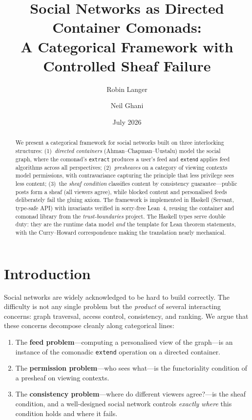 \documentclass[11pt,a4paper]{article}
\title{Social Networks as Directed Container Comonads:\\
A Categorical Framework with Controlled Sheaf Failure}
\author{Robin Langer \and Neil Ghani}
\date{July 2026}
\theoremstyle{definition}
\theoremstyle{plain}
\theoremstyle{remark}
\begin{document}
\maketitle

\begin{abstract}
We present a categorical framework for social networks built on three
interlocking structures: (1)~\emph{directed containers}
(Ahman--Chapman--Uustalu) model the social graph, where the comonad's
\texttt{extract} produces a user's feed and \texttt{extend} applies
feed algorithms across all perspectives; (2)~\emph{presheaves} on a
category of viewing contexts model permissions, with contravariance
capturing the principle that less privilege sees less content;
(3)~the \emph{sheaf condition} classifies content by consistency
guarantee---public posts form a sheaf (all viewers agree), while
blocked content and personalised feeds deliberately fail the gluing
axiom. The framework is implemented in Haskell (Servant, type-safe
API) with invariants verified in sorry-free Lean~4, reusing the
container and comonad library from the \emph{trust-boundaries}
project. The Haskell types serve double duty: they are the runtime
data model \emph{and} the template for Lean theorem statements, with
the Curry--Howard correspondence making the translation nearly
mechanical.
\end{abstract}

\tableofcontents

\section{Introduction}

Social networks are widely acknowledged to be hard to build correctly.
The difficulty is not any single problem but the \emph{product} of
several interacting concerns: graph traversal, access control,
consistency, and ranking. We argue that these concerns decompose
cleanly along categorical lines:

\begin{enumerate}[nosep]
  \item The \textbf{feed problem}---computing a personalised view of
    the graph---is an instance of the comonadic \texttt{extend}
    operation on a directed container.
  \item The \textbf{permission problem}---who sees what---is the
    functoriality condition of a presheaf on viewing contexts.
  \item The \textbf{consistency problem}---where do different viewers
    agree?---is the sheaf condition, and a well-designed social network
    controls \emph{exactly where} this condition holds and where it
    fails.
\end{enumerate}
\end{document}
